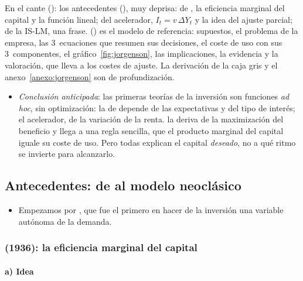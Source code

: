 \documentclass[11pt]{article}
\begin{document}
\begin{notaopositor}
En el cante (): los antecedentes (), muy deprisa: de , la eficiencia marginal del capital y la función lineal; del acelerador, $I_t=v\,\Delta Y_t$ y la idea del ajuste parcial; de la IS-LM, una frase.  () es el modelo de referencia: supuestos, el problema de la empresa, las 3~ecuaciones que resumen sus decisiones, el coste de uso con sus 3~componentes, el gráfico~\ref{fig:jorgenson}, las implicaciones, la evidencia y la valoración, que lleva a los costes de ajuste. La derivación de la caja gris y el anexo~\ref{anexo:jorgenson} son de profundización.
\end{notaopositor}

\begin{itemize}
\item \emph{Conclusión anticipada}: las primeras teorías de la inversión son funciones \emph{ad hoc}, sin optimización: la de  depende de las expectativas y del tipo de interés; el acelerador, de la variación de la renta.  la deriva de la maximización del beneficio y llega a una regla sencilla, que el producto marginal del capital iguale su coste de uso. Pero todas explican el capital \emph{deseado}, no a qué ritmo se invierte para alcanzarlo.
\end{itemize}

\subsection{Antecedentes: de  al modelo neoclásico}\label{sec:antecedentes}

\begin{itemize}
\item Empezamos por , que fue el primero en hacer de la inversión una variable autónoma de la demanda.
\end{itemize}

\subsubsection{ (1936): la eficiencia marginal del capital}\label{sec:keynes}

\paragraph{a) Idea}
\end{document}
